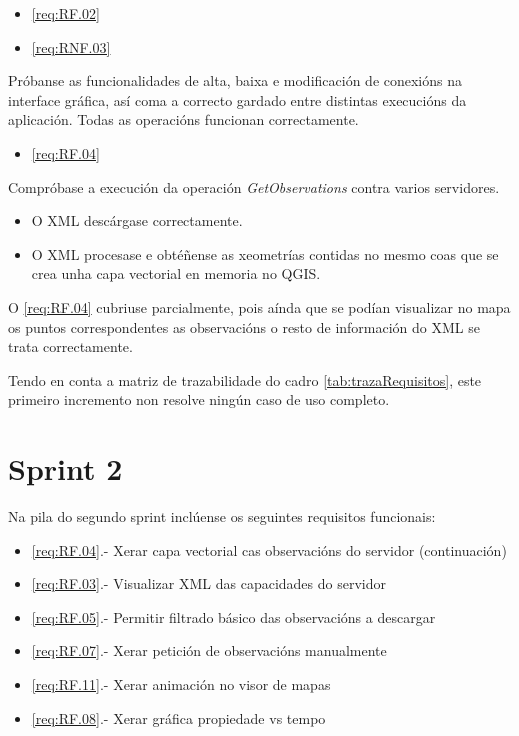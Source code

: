 		  {\begin{itemize}\item \ref{req:RF.02} \item \ref{req:RNF.03}\end{itemize}} %
		  {Próbanse as funcionalidades de alta, baixa e modificación de conexións na interface gráfica, así coma a correcto gardado entre distintas execucións da aplicación.} %
		  {Todas as operacións funcionan correctamente.} %

		  {\begin{itemize}\item \ref{req:RF.04} \\\end{itemize}} %
		  {Compróbase a execución da operación \emph{GetObservations} contra varios servidores.} %
		  {\begin{itemize}
		  \item O XML descárgase correctamente.
		  \item O XML procesase e obtéñense as xeometrías contidas no mesmo coas que se crea unha capa vectorial en memoria no QGIS.
		  \end{itemize}} %
		  
O \ref{req:RF.04} cubriuse parcialmente, pois aínda que se podían visualizar no mapa os puntos correspondentes as observacións o resto de información do XML se trata correctamente.

Tendo en conta a matriz de trazabilidade do cadro \ref{tab:trazaRequisitos}, este primeiro incremento non resolve ningún caso de uso completo.

\section{Sprint 2}
Na pila do segundo sprint inclúense os seguintes requisitos funcionais:
\begin{itemize}
\item \ref{req:RF.04}.- Xerar capa vectorial cas observacións do servidor (continuación)
\item \ref{req:RF.03}.- Visualizar XML das capacidades do servidor
\item \ref{req:RF.05}.- Permitir filtrado básico das observacións a descargar
\item \ref{req:RF.07}.- Xerar petición de observacións manualmente
\item \ref{req:RF.11}.- Xerar animación no visor de mapas
\item \ref{req:RF.08}.- Xerar gráfica propiedade vs tempo
\end{itemize}

